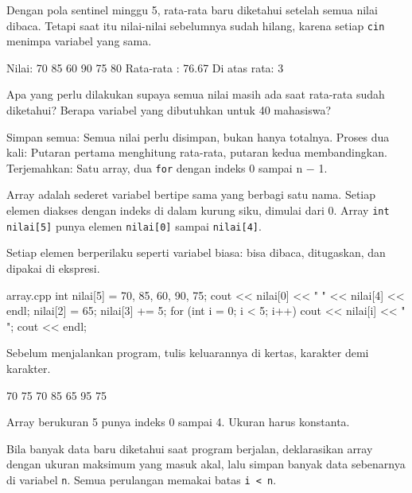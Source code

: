 \documentclass[a4paper]{article}
\begin{document}
Dengan pola sentinel minggu 5, rata-rata baru diketahui setelah semua nilai dibaca. Tetapi saat itu nilai-nilai sebelumnya sudah hilang, karena setiap \texttt{cin} menimpa variabel yang sama.

\begin{MKeluaran}[title={Tampilan yang diinginkan}]
Nilai: 70 85 60 90 75 80
Rata-rata   : 76.67
Di atas rata: 3
\end{MKeluaran}
\begin{Tebak}
Apa yang perlu dilakukan supaya semua nilai masih ada saat rata-rata sudah diketahui? Berapa variabel yang dibutuhkan untuk 40 mahasiswa?
\end{Tebak}
\begin{Jawaban}
Simpan semua: Semua nilai perlu disimpan, bukan hanya totalnya. Proses dua kali: Putaran pertama menghitung rata-rata, putaran kedua membandingkan. Terjemahkan: Satu array, dua \texttt{for} dengan indeks 0 sampai n − 1.
\end{Jawaban}
Array adalah sederet variabel bertipe sama yang berbagi satu nama. Setiap elemen diakses dengan indeks di dalam kurung siku, dimulai dari 0. Array \texttt{int nilai[5]} punya elemen \texttt{nilai[0]} sampai \texttt{nilai[4]}.

Setiap elemen berperilaku seperti variabel biasa: bisa dibaca, ditugaskan, dan dipakai di ekspresi.

\begin{MKode}{array.cpp}
int nilai[5] = {70, 85, 60, 90, 75};
cout << nilai[0] << " " << nilai[4] << endl;
nilai[2] = 65;
nilai[3] += 5;
for (int i = 0; i < 5; i++) {
    cout << nilai[i] << " ";
}
cout << endl;
\end{MKode}
\begin{Tebak}[]
Sebelum menjalankan program, tulis keluarannya di kertas, karakter demi karakter.
\end{Tebak}
\begin{Jawaban}[]
\begin{MKeluaran}[]
70 75
70 85 65 95 75 
\end{MKeluaran}
Array berukuran 5 punya indeks 0 sampai 4. Ukuran harus konstanta.
\end{Jawaban}
Bila banyak data baru diketahui saat program berjalan, deklarasikan array dengan ukuran maksimum yang masuk akal, lalu simpan banyak data sebenarnya di variabel \texttt{n}. Semua perulangan memakai batas \texttt{i < n}.
\end{document}
